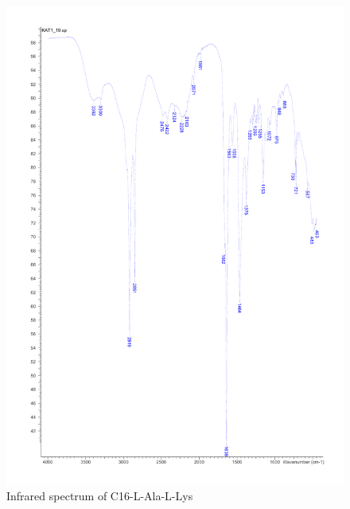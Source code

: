 \begin{figure}[ht!]
\centering
\includegraphics[scale=0.6]{IR/KAT1_19.pdf}
\caption{Infrared spectrum of C16-L-Ala-L-Lys}
\end{figure}

